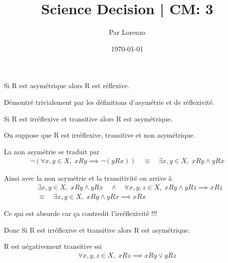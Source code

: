 \documentclass[a4paper, 12pt]{article}
\title{Science Decision | CM: 3}
\author{Par Lorenzo}
\date{\today}
\begin{document}
\maketitle

\begin{proposition}
    Si R est asymétrique alors R est réflexive.
\end{proposition}

\noindent
Démontré trivialement par les définitions d'asymétrie et de réflexivité.

\begin{proposition}
    Si R est irréflexive et transitive alors R est asymétrique.
\end{proposition}

\begin{demonstration}
    On suppose que R est irréflexive, transitive et non asymétrique.

    \vspace{0.5em}

    La non asymétrie se traduit par
    \begin{align*}
        \neg(\forall x, y \in X, \; xRy \implies \neg(yRx)) \quad \equiv \quad \exists x, y \in X, \; xRy \land yRx 
    \end{align*}

    Ainsi avec la non asymétrie et la transitivité on arrive à
    \begin{align*}
        &\exists x, y \in X, \; xRy \land yRx \quad \land \quad \forall x, y, z \in X, \; xRy \land yRz \implies xRz \\
        &\equiv \quad \exists x, y \in X, \; xRy \land yRx \implies xRx
    \end{align*}

    Ce qui est absurde car ça contredit l'irréflexivité !!!

    \begin{rdem}
        Donc Si R est irréflexive et transitive alors R est asymétrique.
    \end{rdem}
\end{demonstration}

\begin{proposition}
    R est négativement transitive ssi
    \begin{align*}
        \forall x, y, z \in X, \; xRz \implies xRy \lor yRz
    \end{align*}
\end{proposition}
\end{document}
